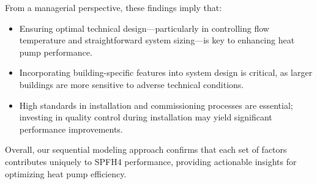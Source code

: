 \documentclass{article}
\begin{document}
From a managerial perspective, these findings imply that:
\begin{itemize}
    \item Ensuring optimal technical design—particularly in controlling flow temperature and straightforward system sizing—is key to enhancing heat pump performance.
    \item Incorporating building-specific features into system design is critical, as larger buildings are more sensitive to adverse technical conditions.
    \item High standards in installation and commissioning processes are essential; investing in quality control during installation may yield significant performance improvements.
\end{itemize}
Overall, our sequential modeling approach confirms that each set of factors contributes uniquely to SPFH4 performance, providing actionable insights for optimizing heat pump efficiency.
\end{document}
